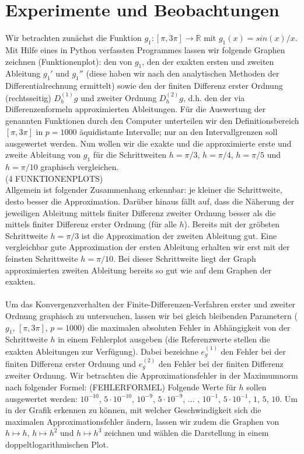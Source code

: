 \documentclass{scrartcl}
\begin{document}
\pagebreak \section{Experimente und Beobachtungen}
\label{sec:experimente}

Wir betrachten zunächst die Funktion $g_1:[\pi, 3\pi] \rightarrow \mathbb{R}$ mit $g_1(x) = sin(x)/x$. Mit Hilfe eines in Python verfassten Programmes lassen wir folgende Graphen zeichnen (Funktionenplot): den von $g_1$, den der exakten ersten und zweiten Ableitung $g_1'$ und $g_1''$ (diese haben wir nach den analytischen Methoden der Differentialrechnung ermittelt) sowie den der finiten Differenz erster Ordnung (rechtsseitig) $D_h^{(1)}g$ und zweiter Ordnung $D_h^{(2)}g$, d.h. den der via Differenzenformeln approximierten Ableitungen. Für die Auswertung der genannten Funktionen durch den Computer unterteilen wir den Definitionsbereich $[\pi, 3\pi]$ in $p = 1000$ äquidistante Intervalle; nur an den Intervallgrenzen soll ausgewertet werden. Nun wollen wir die exakte und die approximierte erste und zweite Ableitung von $g_1$ für die Schrittweiten $h = \pi/3$, $h = \pi/4$, $h = \pi/5$ und $h = \pi/10$ graphisch vergleichen. \\
(4 FUNKTIONENPLOTS) \\
Allgemein ist folgender Zusammenhang erkennbar: je kleiner die Schrittweite, desto besser die Approximation. Darüber hinaus fällt auf, dass die Näherung der jeweiligen Ableitung mittels finiter Differenz zweiter Ordnung besser als die mittels finiter Differenz erster Ordnung (für alle $h$). Bereits mit der gröbsten Schrittweite $h = \pi/3$ ist die Approximation der zweiten Ableitung gut. Eine vergleichbar gute Approximation der ersten Ableitung erhalten wir erst mit der feinsten Schrittweite $h = \pi/10$. Bei dieser Schrittweite liegt der Graph approximierten zweiten Ableitung bereits so gut wie auf dem Graphen der exakten. \\
 \\
Um das Konvergenzverhalten der Finite-Differenzen-Verfahren erster und zweiter Ordnung graphisch zu untersuchen, lassen wir bei gleich bleibenden Parametern ($g_1$, $[\pi, 3\pi]$, $p = 1000$) die maximalen absoluten Fehler in Abhängigkeit von der Schrittweite $h$ in einem Fehlerplot ausgeben (die Referenzwerte stellen die exakten Ableitungen zur Verfügung). Dabei bezeichne $e_g^{(1)}$ den Fehler bei der finiten Differenz erster Ordnung und $e_g^{(2)}$ den Fehler bei der finiten Differenz zweiter Ordnung. Wir betrachten die Approximationsfehler in der Maximumnorm nach folgender Formel: (FEHLERFORMEL) Folgende Werte für $h$ sollen ausgewertet werden: $10^{-10}$, $5 \cdot 10^{-10}$, $10^{-9}$, $5 \cdot 10^{-9}$, ... , $10^{-1}$, $5 \cdot 10^{-1}$, $1$, $5$, $10$. Um in der Grafik erkennen zu können, mit welcher Geschwindigkeit sich die maximalen Approximationsfehler ändern, lassen wir zudem die Graphen von $h \mapsto h$, $h \mapsto h^{2}$ und $h \mapsto h^{3}$ zeichnen und wählen die Darstellung in einem doppeltlogarithmischen Plot. \\
\end{document}
